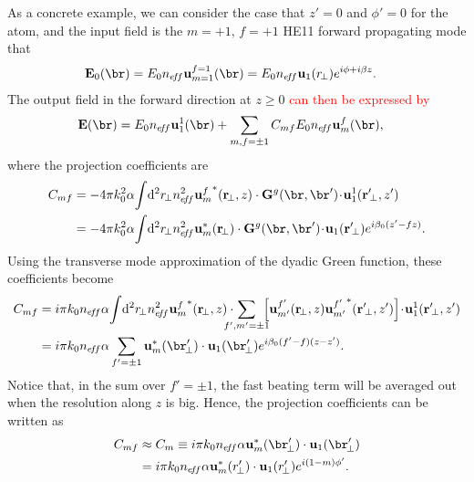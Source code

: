 \documentclass[]{report}
\begin{document}
As a concrete example, we can consider the case that $ z'=0 $ and $ \phi'=0 $ for the atom, and the input field is the $ m=+1,\,f=+1 $ HE11 forward propagating mode that
\begin{align}
\mathbf{E}_0(\br) &= E_0n_{e\!f\!f} \mathbf{u}_{m=1}^{f=1} (\br) = E_0n_{e\!f\!f} \mathbf{u}_1 (r\!_\perp)e^{i\phi+i\beta z}. 
\end{align}
The output field in the forward direction at $ z\ge 0 $ \textcolor{red}{can then be expressed by}
\begin{align}
\mathbf{E}(\br) &= E_0n_{e\!f\!f}\mathbf{u}_{1}^{1} (\br) + \sum_{m,f=\pm 1} C_{mf} E_0n_{e\!f\!f} \mathbf{u}_m^f(\br),  
\end{align}
where the projection coefficients are 
\begin{align}
C_{mf} &= -4\pi k_0^2 \alpha \!\int\! \mathrm{d}^2r\!_\perp n^2_{e\!f\!f} {\mathbf{u}^f_m}^*(\mathbf{r}\!_\perp,z)\cdot \mathbf{G}^g(\br,\br') \!\cdot\! \mathbf{u}_1^1(\mathbf{r}^\prime\!_\perp,z')\\
&= -4\pi k_0^2 \alpha \!\int\! \mathrm{d}^2r\!_\perp n^2_{e\!f\!f} {\mathbf{u}^*_m}(\mathbf{r}\!_\perp)\cdot \mathbf{G}^g(\br,\br') \!\cdot\! \mathbf{u}_1(\mathbf{r}^\prime\!_\perp)e^{i\beta_0(z'-fz)}.
\end{align}
Using the transverse mode approximation of the dyadic Green function, these coefficients become
\begin{align}
C_{mf} &= i\pi k_0 n_{e\!f\!f}\alpha \!\int\! \mathrm{d}^2r\!_\perp n^2_{e\!f\!f} {\mathbf{u}^f_m}^*(\mathbf{r}\!_\perp,z)\cdot\!\!\!\!\!\! \sum_{f',m'=\pm 1}\!\!\!\! \left[\mathbf{u}_{m'}^{f'}(\mathbf{r}\!_\perp,z){\mathbf{u}^{f'}_{m'}}^*(\mathbf{r}^\prime\!_\perp,z') \right]\!\cdot\! \mathbf{u}_1^1(\mathbf{r}^\prime\!_\perp,z')\\
&= i\pi k_0 n_{e\!f\!f}\alpha \sum_{f'=\pm 1} \mathbf{u}^*_m(\br'_{\!\perp})\cdot \mathbf{u}_1(\br'_{\!\perp})e^{i\beta_0 (f'-f)(z-z')}.
\end{align}
Notice that, in the sum over $ f'=\pm 1 $, the fast beating term will be averaged out when the resolution along $ z $ is big. Hence, the projection coefficients can be written as 
\begin{align}
C_{mf} &\approx C_m\equiv  i\pi k_0 n_{e\!f\!f}\alpha  \mathbf{u}^*_m(\br'_{\!\perp})\cdot \mathbf{u}_1(\br'_{\!\perp})\\
&= i\pi k_0 n_{e\!f\!f}\alpha  \mathbf{u}^*_m(r'_{\!\perp})\cdot \mathbf{u}_1(r'_{\!\perp})e^{i(1-m)\phi'}.
\end{align}
\end{document}
